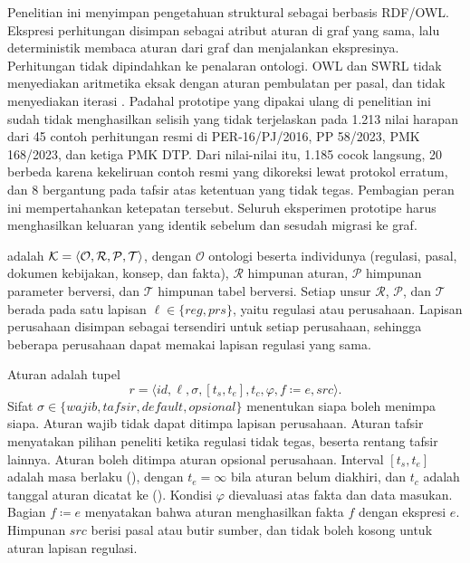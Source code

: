 Penelitian ini menyimpan pengetahuan struktural sebagai  berbasis RDF/OWL. Ekspresi perhitungan disimpan sebagai atribut  aturan di graf yang sama, lalu  deterministik membaca aturan dari graf dan menjalankan ekspresinya. Perhitungan tidak dipindahkan ke penalaran ontologi. OWL dan SWRL tidak menyediakan aritmetika eksak dengan aturan pembulatan per pasal, dan tidak menyediakan iterasi . Padahal prototipe  yang dipakai ulang di penelitian ini sudah tidak menghasilkan selisih yang tidak terjelaskan pada 1.213 nilai harapan dari 45 contoh perhitungan resmi di PER-16/PJ/2016, PP 58/2023, PMK 168/2023, dan ketiga PMK DTP. Dari nilai-nilai itu, 1.185 cocok langsung, 20 berbeda karena kekeliruan contoh resmi yang dikoreksi lewat protokol erratum, dan 8 bergantung pada tafsir atas ketentuan yang tidak tegas. Pembagian peran ini mempertahankan ketepatan tersebut. Seluruh eksperimen prototipe harus menghasilkan keluaran yang identik sebelum dan sesudah migrasi ke graf.

\begin{definisi}
\label{def:kb}
 adalah $\mathcal{K} = \langle \mathcal{O}, \mathcal{R}, \mathcal{P}, \mathcal{T} \rangle$, dengan $\mathcal{O}$ ontologi beserta individunya (regulasi, pasal, dokumen kebijakan, konsep, dan fakta), $\mathcal{R}$ himpunan aturan, $\mathcal{P}$ himpunan parameter berversi, dan $\mathcal{T}$ himpunan tabel berversi. Setiap unsur $\mathcal{R}$, $\mathcal{P}$, dan $\mathcal{T}$ berada pada satu lapisan $\ell \in \{\mathit{reg}, \mathit{prs}\}$, yaitu regulasi atau perusahaan. Lapisan perusahaan disimpan sebagai  tersendiri untuk setiap perusahaan, sehingga beberapa perusahaan dapat memakai lapisan regulasi yang sama.
\end{definisi}

\begin{definisi}[Aturan]
\label{def:aturan}
Aturan adalah tupel
\[ r = \langle \mathit{id}, \ell, \sigma, [t_s, t_e], t_c, \varphi, f \coloneqq e, \mathit{src} \rangle. \]
Sifat $\sigma \in \{\mathit{wajib}, \mathit{tafsir}, \mathit{default}, \mathit{opsional}\}$ menentukan siapa boleh menimpa siapa. Aturan wajib tidak dapat ditimpa lapisan perusahaan. Aturan tafsir menyatakan pilihan peneliti ketika regulasi tidak tegas, beserta rentang tafsir lainnya. Aturan  boleh ditimpa aturan opsional perusahaan. Interval $[t_s, t_e]$ adalah masa berlaku (), dengan $t_e = \infty$ bila aturan belum diakhiri, dan $t_c$ adalah tanggal aturan dicatat ke  (). Kondisi $\varphi$ dievaluasi atas fakta dan data masukan. Bagian $f \coloneqq e$ menyatakan bahwa aturan menghasilkan fakta $f$ dengan ekspresi $e$. Himpunan $\mathit{src}$ berisi pasal atau butir sumber, dan tidak boleh kosong untuk aturan lapisan regulasi.
\end{definisi}

